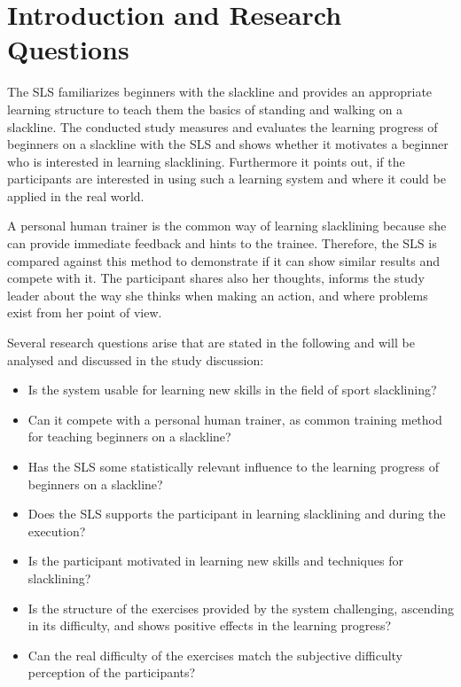 \section{Introduction and Research Questions}\label{6_introduction}
The SLS familiarizes beginners with the slackline and provides an appropriate learning structure to teach them the basics of standing and walking on a slackline.
The conducted study measures and evaluates the learning progress of beginners on a slackline with the SLS and shows whether it motivates a beginner who is interested in learning slacklining.
Furthermore it points out, if the participants are interested in using such a learning system and where it could be applied in the real world.

A personal human trainer is the common way of learning slacklining because she can provide immediate feedback and hints to the trainee.
Therefore, the SLS is compared against this method to demonstrate if it can show similar results and compete with it.
The participant shares also her thoughts, informs the study leader about the way she thinks when making an action, and where problems exist from her point of view.

Several research questions arise that are stated in the following and will be analysed and discussed in the study discussion:

\begin{itemize}
\item Is the system usable for learning new skills in the field of sport slacklining?
\item Can it compete with a personal human trainer, as common training method for teaching beginners on a slackline?
\item Has the SLS some statistically relevant influence to the learning progress of beginners on a slackline?
\item Does the SLS supports the participant in learning slacklining and during the execution?
\item Is the participant motivated in learning new skills and techniques for slacklining?
\item Is the structure of the exercises provided by the system challenging, ascending in its difficulty, and shows positive effects in the learning progress?
\item Can the real difficulty of the exercises match the subjective difficulty perception of the participants?
\end{itemize}
